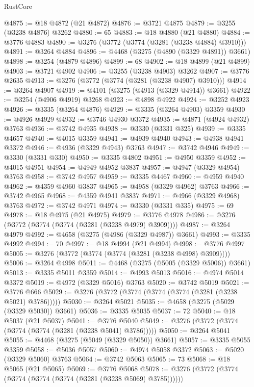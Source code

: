 \begin{lexlean}{RustCore}
\begin{coremodule}
@4875 := @18 @4872 (@21 @4872)
@4876 := @3721 @4875
@4879 := @3255 (@3238 @4876) @3262
@4880 := 65
@4883 := @18 @4880 (@21 @4880)
@4884 := @3776 @4883
@4890 := @3276 (@3772 (@3774 (@3281 (@3238 @4884) @3910)))
@4891 := @3264 @4884
@4896 := @4468 (@3275 (@4890 (@3329 @4891)) @3661)
@4898 := @3254 (@4879 @4896)
@4899 := 68
@4902 := @18 @4899 (@21 @4899)
@4903 := @3721 @4902
@4906 := @3255 (@3238 @4903) @3262
@4907 := @3776 @2635
@4913 := @3276 (@3772 (@3774 (@3281 (@3238 @4907) @3910)))
@4914 := @3264 @4907
@4919 := @4101 (@3275 (@4913 (@3329 @4914)) @3661)
@4922 := @3254 (@4906 @4919) @3268
@4923 := @4898 @4922
@4924 := @3252 @4923
@4926 := @3335 (@3264 @4876)
@4929 := @3335 (@3264 @4903) @3359
@4930 := @4926 @4929
@4932 := @3746 @4930 @3372
@4935 := @4871 (@4924 @4932) @3763
@4936 := @3742 @4935
@4938 := @3330 (@3331 @325)
@4939 := @3335 @4657
@4940 := @4015 @3359
@4941 := @4939 @4940
@4943 := @4938 @4941 @3372
@4946 := @4936 (@3329 @4943) @3763
@4947 := @3742 @4946
@4949 := @3330 (@3331 @330)
@4950 := @3335 @4802
@4951 := @4950 @3359
@4952 := @4015 @4951
@4954 := @4949 @4952 @3837
@4957 := @4947 (@3329 @4954) @3763
@4958 := @3742 @4957
@4959 := @3335 @4467
@4960 := @4959 @4940
@4962 := @4359 @4960 @3837
@4965 := @4958 (@3329 @4962) @3763
@4966 := @3742 @4965
@4968 := @4359 @4941 @3837
@4971 := @4966 (@3329 @4968) @3763
@4972 := @3742 @4971
@4974 := @3330 (@3331 @335)
@4975 := 69
@4978 := @18 @4975 (@21 @4975)
@4979 := @3776 @4978
@4986 := @3276 (@3772 (@3774 (@3774 (@3281 (@3238 @4979) @3909))))
@4987 := @3264 @4979
@4992 := @4658 (@3275 (@4986 (@3329 @4987)) @3661)
@4993 := @3335 @4992
@4994 := 70
@4997 := @18 @4994 (@21 @4994)
@4998 := @3776 @4997
@5005 := @3276 (@3772 (@3774 (@3774 (@3281 (@3238 @4998) @3909))))
@5006 := @3264 @4998
@5011 := @4468 (@3275 (@5005 (@3329 @5006)) @3661)
@5013 := @3335 @5011 @3359
@5014 := @4993 @5013
@5016 := @4974 @5014 @3372
@5019 := @4972 (@3329 @5016) @3763
@5020 := @3742 @5019
@5021 := @3776 @666
@5029 := @3276 (@3772 (@3774 (@3774 (@3774 (@3281 (@3238 @5021) @3786)))))
@5030 := @3264 @5021
@5035 := @4658 (@3275 (@5029 (@3329 @5030)) @3661)
@5036 := @3335 @5035
@5037 := 72
@5040 := @18 @5037 (@21 @5037)
@5041 := @3776 @5040
@5049 := @3276 (@3772 (@3774 (@3774 (@3774 (@3281 (@3238 @5041) @3786)))))
@5050 := @3264 @5041
@5055 := @4468 (@3275 (@5049 (@3329 @5050)) @3661)
@5057 := @3335 @5055 @3359
@5058 := @5036 @5057
@5060 := @4974 @5058 @3372
@5063 := @5020 (@3329 @5060) @3763
@5064 := @3742 @5063
@5065 := 73
@5068 := @18 @5065 (@21 @5065)
@5069 := @3776 @5068
@5078 := @3276 (@3772 (@3774 (@3774 (@3774 (@3774 (@3281 (@3238 @5069) @3785))))))

\end{coremodule}
\end{lexlean}
